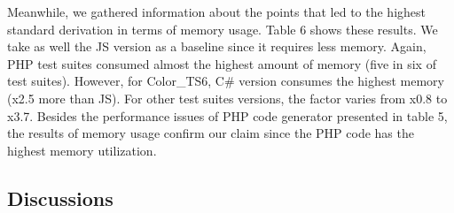 Meanwhile, we gathered information about the points that led to the highest standard derivation in terms of memory usage. Table 6 shows these results. We take as well the JS version as a baseline since it requires less memory. Again, PHP test suites consumed almost the highest amount of memory (five in six of test suites). However, for Color\_TS6, C\# version consumes the highest memory (x2.5 more than JS). For other test suites versions, the factor varies from x0.8 to x3.7. Besides the performance issues of PHP code generator presented in table 5, the results of memory usage confirm our claim since the PHP code has the highest memory utilization.
 


\subsection{Discussions}








